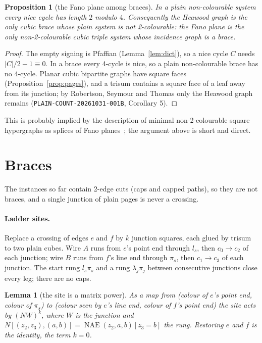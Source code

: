 \documentclass[11pt]{article}
\newtheorem{lemma}[theorem]{Lemma}
\newtheorem{proposition}[theorem]{Proposition}
\theoremstyle{definition}
\theoremstyle{remark}
\newcommand{\NAE}{\operatorname{NAE}}
\begin{document}
\begin{proposition}[the Fano plane among braces]\label{prop:fano}
In a plain non-colourable system every nice cycle has length $2$ modulo $4$.
Consequently the Heawood graph is the only cubic brace whose plain system is
not 2-colourable: the Fano plane is the only non-2-colourable cubic triple
system whose incidence graph is a brace.
\end{proposition}
\begin{proof}
The empty signing is Pfaffian (Lemma~\ref{lem:dict}), so a nice cycle $C$
needs $|C|/2-1\equiv0$. In a brace every 4-cycle is nice, so a plain
non-colourable brace has no 4-cycle. Planar cubic bipartite graphs have
square faces (Proposition~\ref{prop:pages}), and a trisum contains a square
face of a leaf away from its junction; by Robertson, Seymour and Thomas only
the Heawood graph remains (\texttt{PLAIN-COUNT-20261031-001B}, Corollary 5).
\end{proof}
This is probably implied by the description of minimal non-2-colourable
square hypergraphs as splices of Fano planes~\cite{RST99}; the argument above
is short and direct.

\section{Braces}\label{sec:E}

The instances so far contain 2-edge cuts (caps and capped paths), so they are
not braces, and a single junction of plain pages is never a crossing.

\paragraph{Ladder sites.} Replace a crossing of edges $e$ and $f$ by $k$
junction squares, each glued by trisum to two plain cubes. Wire $A$ runs from
$e$'s point end through $l_s$, then $c_0\to c_2$ of each junction; wire $B$
runs from $f$'s line end through $\pi_s$, then $c_1\to c_3$ of each junction.
The start rung $l_s\pi_s$ and a rung $\lambda_j\pi_j$ between consecutive
junctions close every leg; there are no caps.

\begin{lemma}[the site is a matrix power]\label{lem:power}
As a map from (colour of $e$'s point end, colour of $\pi_s$) to (colour seen by
$e$'s line end, colour of $f$'s point end) the site acts by $(NW)^k$, where $W$
is the junction and $N[(z_2,z_3),(a,b)]=\NAE(z_2,a,b)[z_3=b]$ the rung.
Restoring $e$ and $f$ is the identity, the term $k=0$.
\end{lemma}
\end{document}
